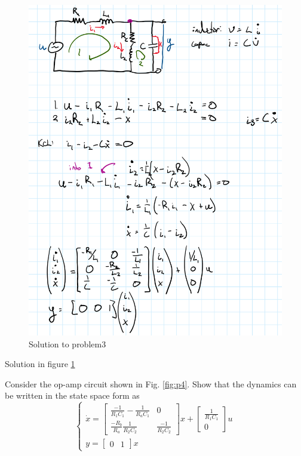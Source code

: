 \documentclass[11pt]{article}
\begin{document}
\begin{figure}[h!] 
    \centering
    \includegraphics[width=0.8 \linewidth]{p3_soln}
    \caption{Solution to problem3}
    \label{fig:p3_soln}
\end{figure}


Solution in figure \ref{fig:p3_soln}




Consider the op-amp circuit shown in Fig. \ref{fig:p4}. Show that the dynamics can
be written in the state space form as
$$
\begin{cases}
    \dot{x} = \begin{bmatrix}
        \frac{-1}{R_1C_1} - \frac{1}{R_aC_1} & 0 \\
        \frac{-R_b}{R_a}\frac{1}{R_2C_2} & \frac{-1}{R_2C_2}
    \end{bmatrix}x + \begin{bmatrix}
        \frac{1}{R_1C_1} \\ 0
    \end{bmatrix} u \\
    y = \begin{bmatrix}
        0 & 1
    \end{bmatrix} x
\end{cases}
$$
\end{document}
